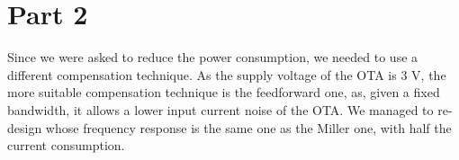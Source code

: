 \chapter{Part 2} %
\label{cha:part_2}

Since we were asked to reduce the power consumption, we needed to use a different compensation technique.
As the supply voltage of the OTA is 3 V, the more suitable compensation technique is the feedforward one, as, given a fixed bandwidth, it allows a lower input current noise of the OTA.
We managed to re-design whose frequency response is the same one as the Miller one, with half the current consumption.


